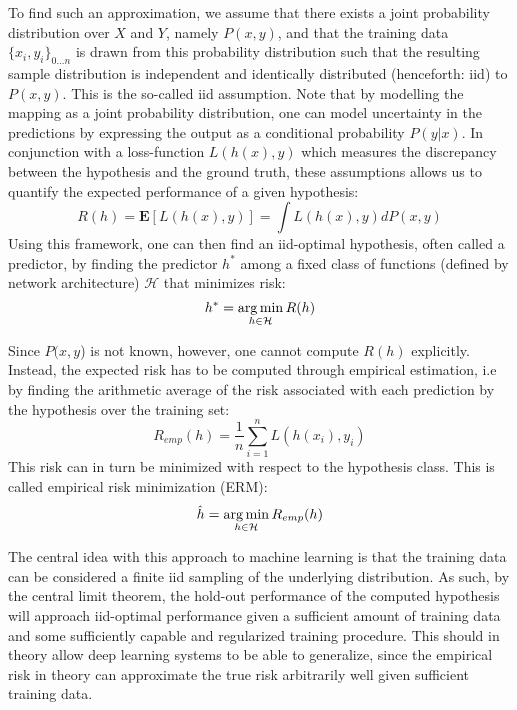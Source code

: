 	To find such an approximation, we assume that there exists a joint probability distribution over \(X\) and \(Y\), namely \(P(x,y)\), and that the training data \(\{x_i, y_i\}_{0...n}\) is drawn from this probability distribution such that the resulting sample distribution is independent and identically distributed (henceforth: iid) to \(P(x,y)\). This is the so-called iid assumption. Note that by modelling the mapping as a joint probability distribution, one can model uncertainty in the predictions by expressing the output as a conditional probability \(P(y|x)\). In conjunction with a loss-function \(L(h(x),y)\) which measures the discrepancy between the hypothesis and the ground truth, these assumptions allows us to quantify the expected performance of a given hypothesis:
	\begin{equation}
	    R(h) = \boldsymbol{E}[L(h(x),y)] = \int L(h(x),y) dP(x,y)
	\end{equation}
	Using this framework, one can then find an iid-optimal hypothesis, often called a predictor, by finding the predictor \(h^*\) among a fixed class of functions (defined by network architecture) \(\mathcal{H}\) that minimizes risk:
	\begin{equation}
	h^* = \operatorname*{arg\,min}_{h \in \mathcal{H}}R(h)
	\end{equation}
	
	Since \(P(x,y\)) is not known, however, one cannot compute \(R(h)\) explicitly. Instead, the expected risk has to be computed through empirical estimation, i.e by finding the arithmetic average of the risk associated with each prediction by the hypothesis over the training set:
	\begin{equation}
	R_{emp}(h) = \frac{1}{n}\sum_{i=1}^{n}L(h(x_i), y_i)
	\end{equation}
	This risk can in turn be minimized with respect to the hypothesis class. This is called empirical risk minimization (ERM):
	\begin{equation}
	\hat{h} = \operatorname*{arg\,min}_{h \in \mathcal{H}}R_{emp}(h)
	\end{equation}
	
	The central idea with this approach to machine learning is that the training data can be considered a finite iid sampling of the underlying distribution. As such, by the central limit theorem, the hold-out performance of the computed hypothesis will approach iid-optimal performance given a sufficient amount of training data and some sufficiently capable and regularized training procedure. This should in theory allow deep learning systems to be able to generalize, since the empirical risk in theory can approximate the true risk arbitrarily well given sufficient training data.
	
